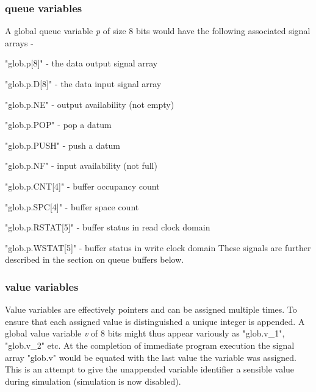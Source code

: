             \subsubsection{queue variables}

                A global queue variable {\em p} of size 8 bits would have
                the following associated signal arrays -
                \blist
                \item   "glob.p[8]" - the data output signal array
                \item   "glob.p.D[8]" - the data input signal array
                \item   "glob.p.NE" - output availability (not empty)
                \item   "glob.p.POP" - pop a datum
                \item   "glob.p.PUSH" - push a datum
                \item   "glob.p.NF" - input availability (not full)
                \item   "glob.p.CNT[4]" - buffer occupancy count
                \item   "glob.p.SPC[4]" - buffer space count
                \item   "glob.p.RSTAT[5]" - buffer status in read clock domain
                \item   "glob.p.WSTAT[5]" - buffer status in write clock domain
                \blend
                These signals are further described in the section on queue
                buffers below.

            \subsubsection{value variables}

                Value variables are effectively pointers and can be assigned
                multiple times. To ensure that each assigned value is
                distinguished a unique integer is appended. A global value
                variable {\em v} of 8 bits might thus appear variously as
                "glob.v\_1", "glob.v\_2" etc.                 At the completion
                of immediate program execution the signal array "glob.v" would
                be equated with the last value the variable was assigned. This
                is an attempt to give the unappended variable identifier a
                sensible value during simulation (simulation is now disabled).

